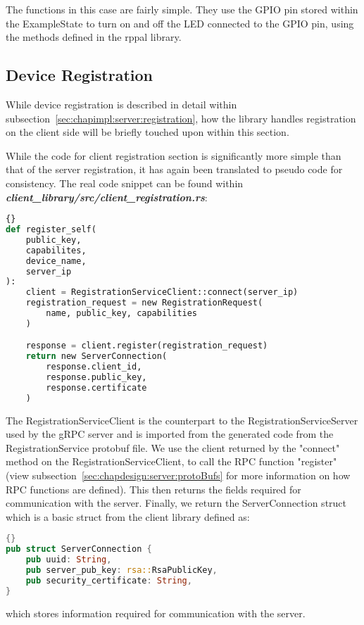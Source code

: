 The functions in this case are fairly simple. They use the GPIO pin stored within the ExampleState to turn on and off the LED connected to the GPIO pin, using the methods defined in the rppal library.

\subsection{Device Registration} \label{sec:chapimpl:devicelib:registration}
While device registration is described in detail within subsection~\ref{sec:chapimpl:server:registration}, how the library handles registration on the client side will be briefly touched upon within this section.

While the code for client registration section is significantly more simple than that of the server registration, it has again been translated to pseudo code for consistency. The real code snippet can be found within \textit{\textbf{client\_library/src/client\_registration.rs}}: 
\begin{lstlisting}[language=Python, style=boxed, showstringspaces=false]{}
def register_self(
    public_key,
    capabilites,
    device_name,
    server_ip
):
    client = RegistrationServiceClient::connect(server_ip)
    registration_request = new RegistrationRequest(
        name, public_key, capabilities
    )

    response = client.register(registration_request)
    return new ServerConnection(
        response.client_id,
        response.public_key,
        response.certificate
    )
\end{lstlisting}
The RegistrationServiceClient is the counterpart to the RegistrationServiceServer used by the gRPC server and is imported from the generated code from the RegistrationService protobuf file. We use the client returned by the "connect" method on the RegistrationServiceClient, to call the RPC function "register" (view subsection~\ref{sec:chapdesign:server:protoBufs} for more information on how RPC functions are defined). This then returns the fields required for communication with the server. Finally, we return the ServerConnection struct which is a basic struct from the client library defined as:
\begin{lstlisting}[language=Rust, style=boxed, showstringspaces=false]{}
pub struct ServerConnection {
    pub uuid: String,
    pub server_pub_key: rsa::RsaPublicKey,
    pub security_certificate: String,
}
\end{lstlisting}
which stores information required for communication with the server. 

